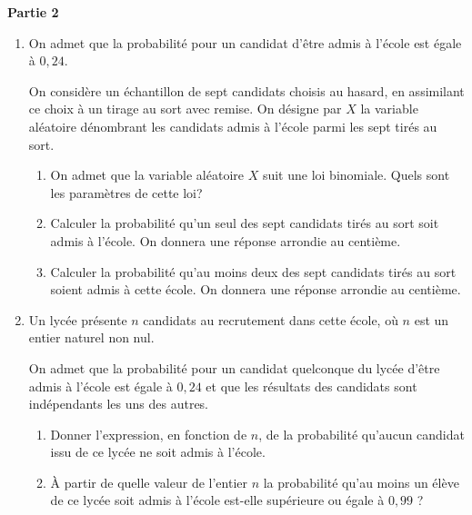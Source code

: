 \documentclass[10pt]{article}
\begin{document}
\textbf{Partie 2}

\medskip

\begin{enumerate}
\item On admet que la probabilité pour un candidat d'être admis à l'école est égale à $0,24$.

On considère un échantillon de sept candidats choisis au hasard, en assimilant ce choix à un tirage au sort avec remise. On désigne par $X$ la variable aléatoire dénombrant les candidats admis à l'école parmi les sept tirés au sort.
	\begin{enumerate}
		\item On admet que la variable aléatoire $X$ suit une loi binomiale. Quels sont les paramètres de cette loi?
		\item Calculer la probabilité qu'un seul des sept candidats tirés au sort soit admis à l'école. On donnera une réponse arrondie au centième.
		\item Calculer la probabilité qu'au moins deux des sept candidats tirés au sort soient admis à cette école. On donnera une réponse arrondie au centième.
	\end{enumerate}
\item  Un lycée présente $n$ candidats au recrutement dans cette école, où $n$ est un entier naturel non nul.

On admet que la probabilité pour un candidat quelconque du lycée d'être admis à l'école est égale à $0,24$ et que les résultats des candidats sont indépendants les uns des autres.
	\begin{enumerate}
		\item Donner l'expression, en fonction de $n$, de la probabilité qu'aucun candidat issu de ce lycée ne soit admis à l'école.
		\item À partir de quelle valeur de l'entier $n$ la probabilité qu'au moins un élève de ce lycée soit admis à l'école est-elle supérieure ou égale à $0,99$ ?
	\end{enumerate}
\end{enumerate}

\bigskip
\end{document}
